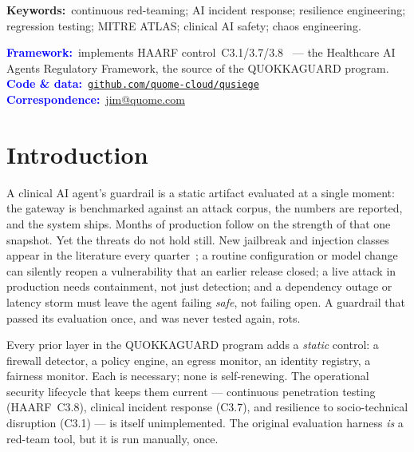 \documentclass[11pt]{article}
\begin{document}
\begin{tcolorbox}[breakable, enhanced jigsaw, colback=black!4, colframe=black!4,
  arc=5pt, boxrule=0pt, left=16pt, right=16pt, top=10pt, bottom=10pt]
\medskip
\noindent\textbf{Keywords:}~continuous red-teaming; AI incident response; resilience
engineering; regression testing; MITRE ATLAS; clinical AI safety; chaos engineering.

\medskip
\noindent\textcolor{blue}{\textbf{Framework:}}~implements HAARF control~C3.1/3.7/3.8~\cite{schwoebel2026haarf} --- the Healthcare AI Agents Regulatory Framework, the source of the QUOKKAGUARD program.\\
\noindent\textcolor{blue}{\textbf{Code \& data:}}~\href{https://github.com/quome-cloud/qusiege}{\texttt{github.com/quome-cloud/qusiege}}\\
\noindent\textcolor{blue}{\textbf{Correspondence:}}~\href{mailto:jim@quome.com}{jim@quome.com}
\end{tcolorbox}

\vspace{2pt}
\vspace{0.3em}

\section{Introduction}
A clinical AI agent's guardrail is a static artifact evaluated at a single moment:
the gateway is benchmarked against an attack corpus, the numbers are reported, and
the system ships. Months of production follow on the strength of that one snapshot.
Yet the threats do not hold still. New jailbreak and injection classes appear in the
literature every quarter~\cite{greshake2023,perez2022}; a routine configuration or
model change can silently reopen a vulnerability that an earlier release closed; a
live attack in production needs containment, not just detection; and a dependency
outage or latency storm must leave the agent failing \emph{safe}, not failing open.
A guardrail that passed its evaluation once, and was never tested again, rots.

Every prior layer in the QUOKKAGUARD program adds a \emph{static}
control: a firewall detector, a policy engine, an egress monitor, an identity
registry, a fairness monitor. Each is necessary; none is self-renewing. The
operational security lifecycle that keeps them current --- continuous penetration
testing (HAARF~C3.8), clinical incident response (C3.7), and resilience to
socio-technical disruption (C3.1) --- is itself unimplemented. The original
evaluation harness \emph{is} a red-team tool, but it is run manually, once.
\end{document}
